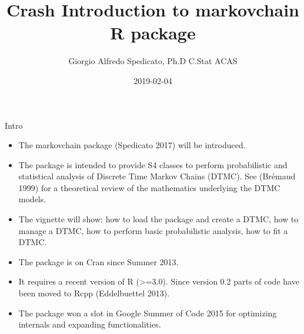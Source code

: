 \documentclass[ignorenonframetext,]{beamer}
\title{Crash Introduction to markovchain R package}
\author{Giorgio Alfredo Spedicato, Ph.D C.Stat ACAS}
\date{2019-02-04}
\providecommand{\tightlist}{%
  \setlength{\itemsep}{0pt}\setlength{\parskip}{0pt}}
\providecommand{\tightlist}{
  \setlength{\itemsep}{0pt}\setlength{\parskip}{0pt}
}
\begin{document}
\frame{\titlepage}

\begin{frame}
\tableofcontents[hideallsubsections]
\end{frame}
\begin{frame}

\end{frame}

\begin{frame}{Intro}
\protect\hypertarget{intro}{}

\begin{itemize}
\tightlist
\item
  The markovchain package (Spedicato 2017) will be introduced.
\item
  The package is intended to provide S4 classes to perform probabilistic
  and statistical analysis of Discrete Time Markov Chains (DTMC). See
  (Brémaud 1999) for a theoretical review of the mathematics underlying
  the DTMC models.
\item
  The vignette will show: how to load the package and create a DTMC, how
  to manage a DTMC, how to perform basic probabilistic analysis, how to
  fit a DTMC.
\end{itemize}

\end{frame}

\begin{frame}

\begin{itemize}
\tightlist
\item
  The package is on Cran since Summer 2013.
\item
  It requires a recent version of R (\textgreater{}=3.0). Since version
  0.2 parts of code have been moved to Rcpp (Eddelbuettel 2013).
\item
  The package won a slot in Google Summer of Code 2015 for optimizing
  internals and expanding functionalities.
\end{itemize}

\end{frame}
\end{document}

